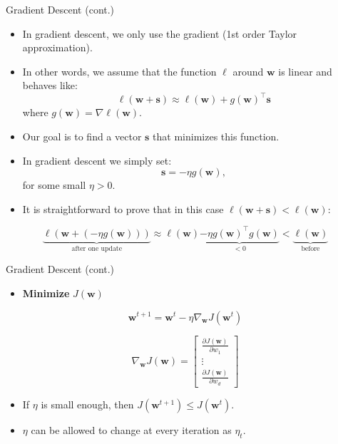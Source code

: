 \documentclass[serif, aspectratio=169]{beamer}
\begin{document}
\begin{frame}{Gradient Descent (cont.)}
    \begin{itemize}
        \item In gradient descent, we only use the gradient (1st order Taylor approximation). 
        \item In other words, we assume that the function $\ell$ around $\mathbf{w}$ is linear and behaves like:
        \[
        \ell(\mathbf{w} + \mathbf{s}) \approx \ell(\mathbf{w}) + g(\mathbf{w})^{\top} \mathbf{s}
        \]
        where $g(\mathbf{w}) = \nabla \ell(\mathbf{w})$.
        \item Our goal is to find a vector $\mathbf{s}$ that minimizes this function.  
        \item In gradient descent we simply set:
        \[
        \mathbf{s} = -\eta g(\mathbf{w}),
        \]
        for some small $\eta > 0$.  
        \item It is straightforward to prove that in this case $\ell(\mathbf{w} + \mathbf{s}) < \ell(\mathbf{w})$:
    \end{itemize}
    
    \vspace{0.0cm}
    \begin{equation*}
        \underbrace{\ell(\mathbf{w} + (-\eta g(\mathbf{w})))}_{\text{after one update}}
        \approx
        \ell(\mathbf{w}) \underbrace{- \eta g(\mathbf{w})^{\top} g(\mathbf{w})}_{<0}
        < 
        \underbrace{\ell(\mathbf{w})}_{\text{before}}
    \end{equation*}
\end{frame}


\begin{frame}{Gradient Descent (cont.)}

    \begin{itemize}
        \item \textbf{Minimize} \( J(\mathbf{w}) \)
    \end{itemize}
    
    \[
    \mathbf{w}^{t+1} = \mathbf{w}^t - \eta \nabla_{\mathbf{w}} J(\mathbf{w}^t)
    \]
    
    \[
    \nabla_{\mathbf{w}} J(\mathbf{w}) = 
    \begin{bmatrix}
        \frac{\partial J(\mathbf{w})}{\partial w_1} \\
        \vdots \\
        \frac{\partial J(\mathbf{w})}{\partial w_d}
    \end{bmatrix}
    \]
    
    \begin{itemize}
        \item If \( \eta \) is small enough, then \( J(\mathbf{w}^{t+1}) \leq J(\mathbf{w}^t) \).
        \item \( \eta \) can be allowed to change at every iteration as \( \eta_t \).
    \end{itemize}

\end{frame}
\end{document}
